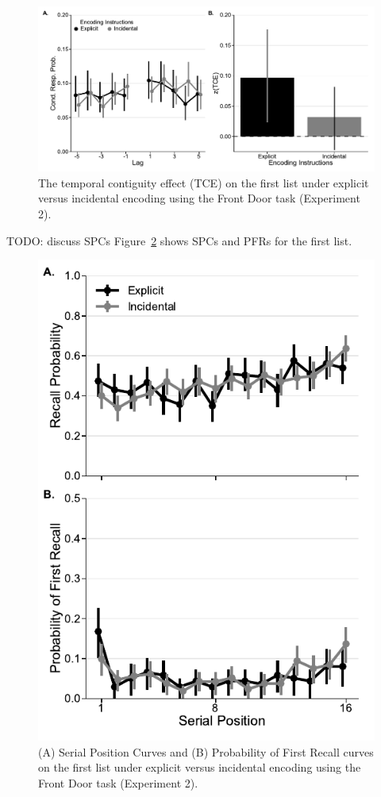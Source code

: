 \documentclass[jou,natbib,floatsintext]{apa6} %
\begin{document}
\begin{figure}%
\includegraphics{figures/E2_crp_list1.pdf}
\caption{The temporal contiguity effect (TCE) on the first list under explicit versus incidental encoding using the Front Door task (Experiment 2). \paneltext}
\label{door}
\end{figure}








\color{red}
TODO: discuss SPCs
Figure~\ref{e2_l1_spc} shows SPCs and PFRs for the first list.


\begin{figure}
\includegraphics{figures/E2_spc_list1.pdf}
\caption{(A) Serial Position Curves and (B) Probability of First Recall curves on the first list under explicit versus incidental encoding using the Front Door task (Experiment 2). \spcpaneltext}
\label{e2_l1_spc}
\end{figure}
\end{document}
